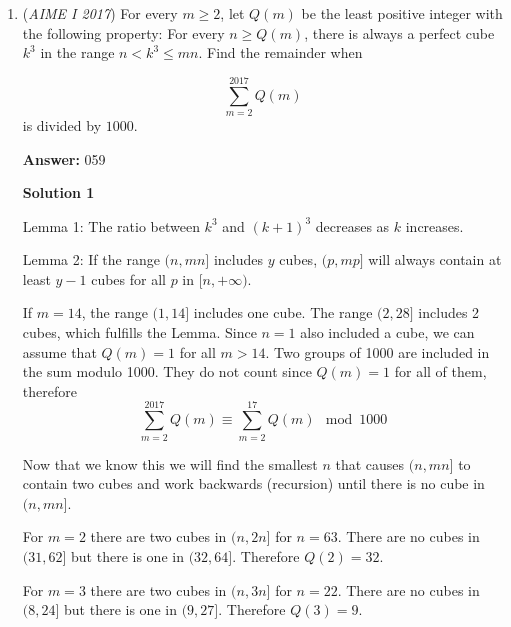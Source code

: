\begin{enumerate}
 \textbf{Case 1}: $S$ contains 2.In this case, seperate the numbers 3, 4, ...10 (excluding 4) into three sets, $[5, 10], [3, 6, 9], [7, 8]$.  The first set has 3 choices, since $S$ can contain 5 or 10 but not both.  The second set then has $2^3-3=5$ valid choices, excluding $(3, 6)$ and $(3, 9); (3, 6, 9)$.  7 and 8 do not appear in any of the prohibited pairs, and therefore have $2^2=4$ choices.  Multiplying $3\cdot 5\cdot 4$, we have 60 options.

 \textbf{Case 2}: $S$ does not contain 2.The only excluded pair possible is $(3, 9)$.  Split the set $[3, 4, 5, 6, 7, 8, 9, 10]$ into $[3, 9]$ and $[4, 5, 6, 7, 8, 10]$.  The first has $2^2-1=3$ choices, excluding $(3, 9)$, and the second has $2^6=64$.  Multiplying, we have $192+60=\boxed{252}$.

 


	\item (\textit{AIME I 2017}) For every $m \geq 2$, let $Q(m)$ be the least positive integer with the following property: For every $n \geq Q(m)$, there is always a perfect cube $k^3$ in the range $n < k^3 \leq mn$. Find the remainder when

 \[\sum_{m = 2}^{2017} Q(m)\]is divided by $1000$.


 
 \textbf{Answer: }059



\textbf{Solution 1}

Lemma 1: The ratio between $k^3$ and $(k+1)^3$ decreases as $k$ increases.

 Lemma 2: If the range $(n,mn]$ includes $y$ cubes, $(p,mp]$ will always contain at least $y-1$ cubes for all $p$ in $[n,+\infty)$.

 If $m=14$, the range $(1,14]$ includes one cube. The range $(2,28]$ includes 2 cubes, which fulfills the Lemma. Since $n=1$ also included a cube, we can assume that $Q(m)=1$ for all $m>14$. Two groups of 1000 are included in the sum modulo 1000. They do not count since $Q(m)=1$ for all of them, therefore 
 \[\sum_{m = 2}^{2017} Q(m) \equiv \sum_{m = 2}^{17} Q(m) \mod 1000\]

 Now that we know this we will find the smallest $n$ that causes $(n,mn]$ to contain two cubes and work backwards (recursion) until there is no cube in $(n,mn]$.

 For $m=2$ there are two cubes in $(n,2n]$ for $n=63$. There are no cubes in $(31,62]$ but there is one in $(32,64]$. Therefore $Q(2)=32$.

 For $m=3$ there are two cubes in $(n,3n]$ for $n=22$. There are no cubes in $(8,24]$ but there is one in $(9,27]$. Therefore $Q(3)=9$.


\end{enumerate}
